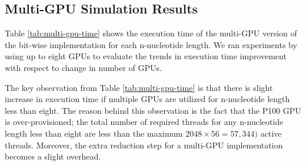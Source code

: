 \subsection {Multi-GPU Simulation Results}
Table \ref{tab:multi-gpu-time} shows the  execution time of the multi-GPU version of the bit-wise implementation for each n-nucleotide length. We ran experiments by using up to eight GPUs to evaluate the trends in execution time improvement with respect to change in number of GPUs. 

The key observation from Table \ref{tab:multi-gpu-time} is that there is slight increase in execution time if multiple GPUs are utilized for n-nucleotide length less than eight. The reason behind this observation is the fact that the P100 GPU is over-provisioned; the total number of required threads for any n-nucleotide length less than eight are less than the maximum $2048\times56 = 57,344)$ active threads. Moreover, the extra reduction step for a multi-GPU implementation becomes a slight overhead.

